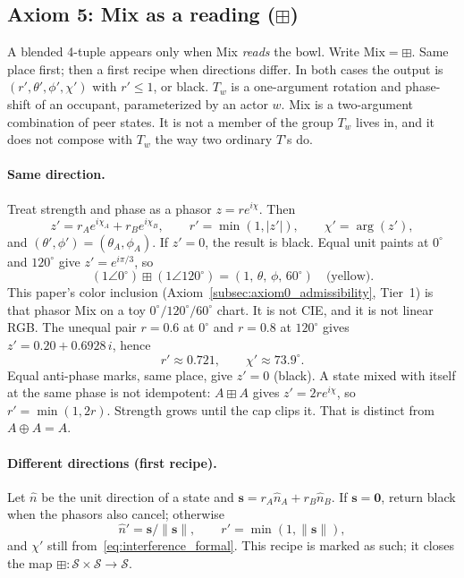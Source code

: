 \documentclass[12pt, a4paper]{article}
\begin{document}
\subsection{Axiom 5: Mix as a reading (\texorpdfstring{$\boxplus$}{boxplus})}
\label{subsec:axiom_interference}
A blended 4-tuple appears only when Mix \emph{reads} the bowl.
Write $\mathrm{Mix}=\boxplus$. Same place first; then a
first recipe when directions differ. In both cases the output is
$(r',\theta',\phi',\chi')$ with $r'\le 1$, or black.
$T_w$ is a one-argument rotation and phase-shift of an occupant,
parameterized by an actor $w$. Mix is a two-argument combination of
peer states. It is not a member of the group $T_w$ lives in, and it
does not compose with $T_w$ the way two ordinary $T$'s do.

\paragraph{Same direction.}
Treat strength and phase as a phasor $z=r e^{i\chi}$. Then
\begin{equation}
    z' = r_A e^{i\chi_A} + r_B e^{i\chi_B},
    \qquad
    r' = \min(1,|z'|),
    \qquad
    \chi' = \arg(z'),
    \label{eq:interference_formal}
\end{equation}
and $(\theta',\phi')=(\theta_A,\phi_A)$. If $z'=0$, the result is
black. Equal unit paints at $0^\circ$ and $120^\circ$ give
$z'=e^{i\pi/3}$, so
\[
(1\angle 0^\circ)\boxplus(1\angle 120^\circ)
=(1,\,\theta,\,\phi,\,60^\circ)
\quad\text{(yellow)}.
\]
This paper's color inclusion
(Axiom~\ref{subsec:axiom0_admissibility}, Tier~1) is that phasor Mix
on a toy $0^\circ/120^\circ/60^\circ$ chart. It is not CIE, and it is
not linear RGB.
The unequal pair $r=0.6$ at $0^\circ$ and $r=0.8$ at $120^\circ$
gives $z'=0.20+0.6928\,i$, hence
\[
r'\approx 0.721,\qquad \chi'\approx 73.9^\circ.
\]
Equal anti-phase marks, same place, give $z'=0$ (black).
A state mixed with itself at the same phase is not idempotent:
$A\boxplus A$ gives $z'=2r e^{i\chi}$, so $r'=\min(1,2r)$.
Strength grows until the cap clips it. That is distinct from
$A\oplus A=A$.

\paragraph{Different directions (first recipe).}
Let $\hat n$ be the unit direction of a state and
$\mathbf{s}=r_A\hat n_A+r_B\hat n_B$. If $\mathbf{s}=\mathbf{0}$,
return black when the phasors also cancel; otherwise
\[
\hat n'=\mathbf{s}/\|\mathbf{s}\|,\qquad
r'=\min(1,\|\mathbf{s}\|),
\]
and $\chi'$ still from~\eqref{eq:interference_formal}.
This recipe is marked as such; it closes the map
$\boxplus:\mathcal{S}\times\mathcal{S}\to\mathcal{S}$.
\end{document}
